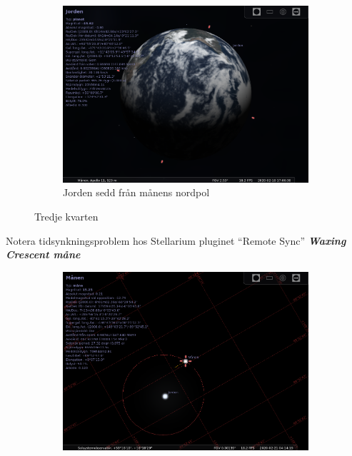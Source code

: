 \documentclass[./exercises.tex]{subfiles}
\begin{document}
\begin{itemize}
\begin{figure}[H]
     \hfill
     \begin{subfigure}[b]{0.45\textwidth}
         \centering
         \includegraphics[width=\textwidth]{Stellarium1/3rdQ/stellarium-005.png}
         \caption{Jorden sedd från månens nordpol}
         \label{fig:three sin x}
     \end{subfigure}
     \hfill
        \caption{ Tredje kvarten}
        \label{fig:perod graphs}
\end{figure}
Notera tidsynkningsproblem hos Stellarium pluginet ``Remote Sync''
\newpage
\textit{\textbf{Waxing Crescent måne}}
\begin{figure}[H]
     \centering
     \begin{subfigure}[b]{0.45\textwidth}
         \centering
         \includegraphics[width=\textwidth]{Stellarium1/WXCresc/stellarium-000.png}

\end{subfigure}
\end{figure}
\end{itemize}
\end{document}
